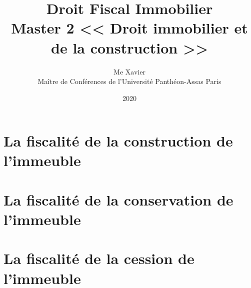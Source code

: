 \documentclass[10pt,a4paper,twoside]{book}
\author{%
Me Xavier \nom{Badin}\\%
Maître de Conférences de l’Université Panthéon-Assas Paris \II
}
\title{%
Droit Fiscal Immobilier \\
Master 2 << Droit immobilier et de la construction >>}
\date{2020}
\begin{document}
	\maketitle
	
	
	
	\part{La fiscalité de la construction de l’immeuble}
		
		
		
		
	
	\part{La fiscalité de la conservation  de l’immeuble}
	
		
		
		
		
		
		
		
	\part{La fiscalité de la cession  de l’immeuble}
	
		
		
		
	\tableofcontents
	
\end{document}
